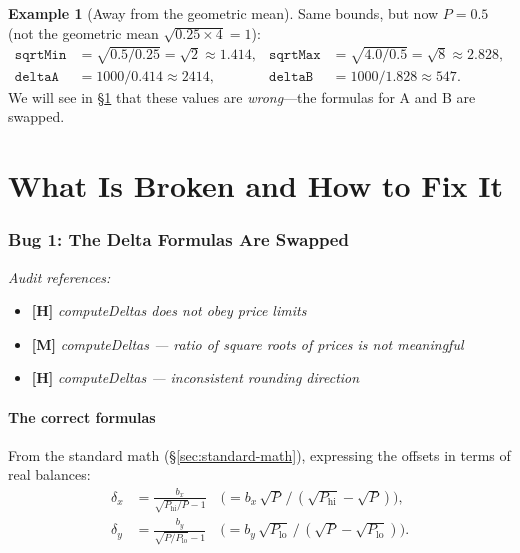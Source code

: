 \documentclass[11pt]{article}
\theoremstyle{definition}
\newtheorem{example}{Example}
\begin{document}
\begin{example}[Away from the geometric mean]\label{ex:computeDeltas-off}
Same bounds, but now $P = 0.5$ (not the geometric mean $\sqrt{0.25 \times 4} = 1$):
\begin{align*}
\texttt{sqrtMin} &= \sqrt{0.5/0.25} = \sqrt{2} \approx 1.414, &
\texttt{sqrtMax} &= \sqrt{4.0/0.5} = \sqrt{8} \approx 2.828,\\
\texttt{deltaA} &= 1000 / 0.414 \approx 2414, &
\texttt{deltaB} &= 1000 / 1.828 \approx 547.
\end{align*}
We will see in \S\ref{sec:bug-deltas} that these values are \emph{wrong}---the
formulas for A and B are swapped.
\end{example}


\part{What Is Broken and How to Fix It}

\section{Bug 1: The Delta Formulas Are Swapped}\label{sec:bug-deltas}

\noindent\textit{Audit references:}
\begin{itemize}[nosep,leftmargin=2em]
\item \textbf{[H]} \textit{computeDeltas does not obey price limits}
\item \textbf{[M]} \textit{computeDeltas --- ratio of square roots of prices is not meaningful}
\item \textbf{[H]} \textit{computeDeltas --- inconsistent rounding direction}
\end{itemize}

\subsection{The correct formulas}

From the standard math (\S\ref{sec:standard-math}), expressing the offsets
in terms of real balances:
\begin{align}
\delta_x &= \frac{b_x}{\sqrt{P_{\mathrm{hi}}/P} - 1}
\quad\bigl(= b_x\,\sqrt{P}\,/\,(\sqrt{P_{\mathrm{hi}}} - \sqrt{P})\bigr),
\label{eq:delta-x-correct} \\
\delta_y &= \frac{b_y}{\sqrt{P/P_{\mathrm{lo}}} - 1}
\quad\bigl(= b_y\,\sqrt{P_{\mathrm{lo}}}\,/\,(\sqrt{P} - \sqrt{P_{\mathrm{lo}}})\bigr).
\label{eq:delta-y-correct}
\end{align}
\end{document}
